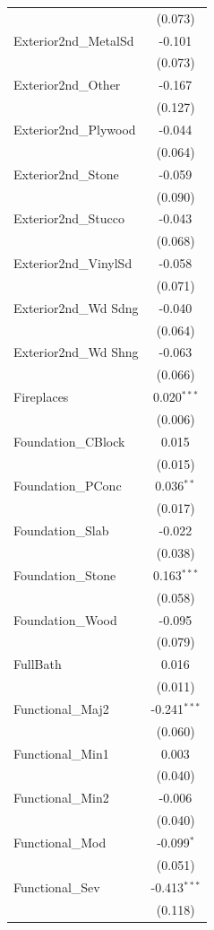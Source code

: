 \begin{table}[!htbp]
\begin{tabular}{@{\extracolsep{5pt}}lc}
& (0.073) \\
 Exterior2nd\_MetalSd & -0.101$^{}$ \\
& (0.073) \\
 Exterior2nd\_Other & -0.167$^{}$ \\
& (0.127) \\
 Exterior2nd\_Plywood & -0.044$^{}$ \\
& (0.064) \\
 Exterior2nd\_Stone & -0.059$^{}$ \\
& (0.090) \\
 Exterior2nd\_Stucco & -0.043$^{}$ \\
& (0.068) \\
 Exterior2nd\_VinylSd & -0.058$^{}$ \\
& (0.071) \\
 Exterior2nd\_Wd Sdng & -0.040$^{}$ \\
& (0.064) \\
 Exterior2nd\_Wd Shng & -0.063$^{}$ \\
& (0.066) \\
 Fireplaces & 0.020$^{***}$ \\
& (0.006) \\
 Foundation\_CBlock & 0.015$^{}$ \\
& (0.015) \\
 Foundation\_PConc & 0.036$^{**}$ \\
& (0.017) \\
 Foundation\_Slab & -0.022$^{}$ \\
& (0.038) \\
 Foundation\_Stone & 0.163$^{***}$ \\
& (0.058) \\
 Foundation\_Wood & -0.095$^{}$ \\
& (0.079) \\
 FullBath & 0.016$^{}$ \\
& (0.011) \\
 Functional\_Maj2 & -0.241$^{***}$ \\
& (0.060) \\
 Functional\_Min1 & 0.003$^{}$ \\
& (0.040) \\
 Functional\_Min2 & -0.006$^{}$ \\
& (0.040) \\
 Functional\_Mod & -0.099$^{*}$ \\
& (0.051) \\
 Functional\_Sev & -0.413$^{***}$ \\
& (0.118) \\

\end{tabular}
\end{table}
